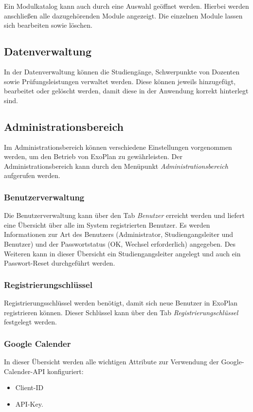 Ein Modulkatalog kann auch durch eine Auswahl geöffnet werden. 
Hierbei werden anschließen alle dazugehörenden Module angezeigt. 
Die einzelnen Module lassen sich bearbeiten sowie löschen.

\subsection{Datenverwaltung}

In der Datenverwaltung können die Studiengänge, Schwerpunkte von Dozenten sowie Prüfungsleistungen verwaltet werden.
Diese können jeweils hinzugefügt, bearbeitet oder gelöscht werden, damit diese in der Anwendung korrekt hinterlegt sind.

\subsection{Administrationsbereich}

Im Administrationsbereich können verschiedene Einstellungen vorgenommen werden, um den Betrieb von ExoPlan zu gewährleisten. 
Der Administrationsbereich kann durch den Menüpunkt \textit{Administrationsbereich} aufgerufen werden.

\subsubsection{Benutzerverwaltung}

Die Benutzerverwaltung kann über den Tab \textit{Benutzer} erreicht werden und liefert eine Übersicht über alle im System registrierten Benutzer. 
Es werden Informationen zur Art des Benutzers (Administrator, Studiengangsleiter und Benutzer) und der Passwortstatus (OK, Wechsel erforderlich) angegeben. 
Des Weiteren kann in dieser Übersicht ein Studiengangsleiter angelegt und auch ein Passwort-Reset durchgeführt werden.

\subsubsection{Registrierungschlüssel}

Registrierungsschlüssel werden benötigt, damit sich neue Benutzer in ExoPlan registrieren können. 
Dieser Schlüssel kann über den Tab \textit{Registrierungschlüssel} festgelegt werden.

\subsubsection{Google Calender}

In dieser Übersicht werden alle wichtigen Attribute zur Verwendung der Google-Calender-API konfiguriert:
\begin{itemize}
	\item Client-ID
	\item API-Key.
\end{itemize}
